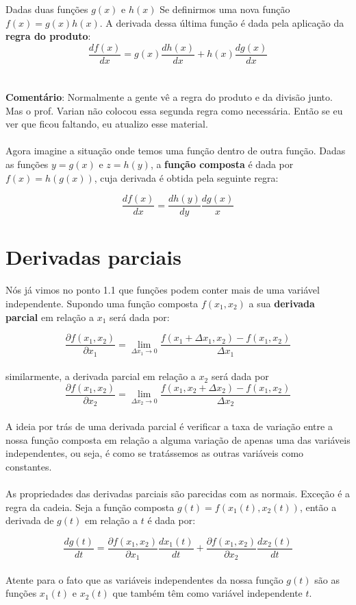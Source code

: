 \documentclass[a4paper,11pt,oneside]{book}
\theoremstyle{definition}
\theoremstyle{break}
\begin{document}
Dadas duas funções $g(x)$ e $h(x)$ Se definirmos uma nova função $f(x) = g(x) h(x)$. A derivada dessa última função é dada pela aplicação da \textbf{regra do produto}:
\\
$$ \frac{df(x)}{dx} = g(x)\frac{dh(x)}{dx} + h(x)\frac{dg(x)}{dx}$$
\\
\\
\textbf{Comentário}: Normalmente a gente vê a regra do produto e da divisão junto. Mas o prof. Varian não colocou essa segunda regra como necessária. Então se eu ver que ficou faltando, eu atualizo esse material.
\\
\\
Agora imagine a situação onde temos uma função dentro de outra função. Dadas as funções $y = g(x)$ e $z = h(y)$, a \textbf{função composta} é dada por $f(x) = h(g(x))$, cuja derivada é obtida pela seguinte regra:

$$ \frac{df(x)}{dx} = \frac{dh(y)}{dy}\frac{dg(x)}{x}$$

\section*{Derivadas parciais}

Nós já vimos no ponto 1.1 que funções podem conter mais de uma variável independente. Supondo uma função composta $f(x_1,x_2)$ a sua \textbf{derivada parcial} em relação a $x_1$ será dada por:

$$ \frac{\partial f(x_1,x_2)}{\partial x_1} = 
\lim_{\Delta x_1 \to 0} \frac{f(x_1+\Delta x_1,x_2) - f(x_1,x_2)}{\Delta x_1} $$
\\
similarmente, a derivada parcial em relação a $x_2$ será dada por
\\
$$ \frac{\partial f(x_1,x_2)}{\partial x_2} = 
\lim_{\Delta x_2 \to 0} \frac{f(x_1,x_2+\Delta x_2) - f(x_1,x_2)}{\Delta x_2} $$
\\
A ideia por trás de uma derivada parcial é verificar a taxa de variação entre a nossa função composta em relação a alguma variação de apenas uma das variáveis independentes, ou seja, é como se tratássemos as outras variáveis como constantes.
\\
\\
As propriedades das derivadas parciais são parecidas com as normais. Exceção é a regra da cadeia. Seja a função composta $g(t) = f(x_1(t),x_2(t))$, então a derivada de $g(t)$ em relação a $t$ é dada por:

$$ \frac{dg(t)}{dt} = 
\frac{\partial f(x_1,x_2)}{\partial x_1}\frac{dx_1(t)}{dt} + 
\frac{\partial f(x_1,x_2)}{\partial x_2}\frac{dx_2(t)}{dt} $$
\\
Atente para o fato que as variáveis independentes da nossa função $g(t)$ são as funções $x_1(t)$ e $x_2(t)$ que também têm como variável independente $t$.
\end{document}
